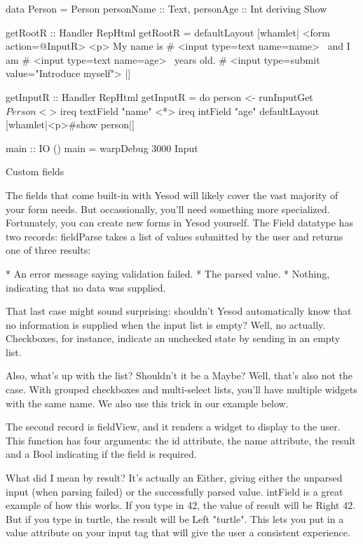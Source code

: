 data Person = Person { personName :: Text, personAge :: Int }
    deriving Show

getRootR :: Handler RepHtml
getRootR = defaultLayout [whamlet|
<form action=@{InputR}>
    <p>
        My name is #
        <input type=text name=name>
        \ and I am #
        <input type=text name=age>
        \ years old. #
        <input type=submit value="Introduce myself">
|]

getInputR :: Handler RepHtml
getInputR = do
    person <- runInputGet $ Person
                <$> ireq textField "name"
                <*> ireq intField "age"
    defaultLayout [whamlet|<p>#{show person}|]

main :: IO ()
main = warpDebug 3000 Input

Custom fields

The fields that come built-in with Yesod will likely cover the vast majority of your form needs. But occassionally, you'll need something more specialized. Fortunately, you can create new forms in Yesod yourself. The Field datatype has two records: fieldParse takes a list of values submitted by the user and returns one of three results:

* An error message saying validation failed.
* The parsed value.
* Nothing, indicating that no data was supplied.

That last case might sound surprising: shouldn't Yesod automatically know that no information is supplied when the input list is empty? Well, no actually. Checkboxes, for instance, indicate an unchecked state by sending in an empty list.

Also, what's up with the list? Shouldn't it be a Maybe? Well, that's also not the case. With grouped checkboxes and multi-select lists, you'll have multiple widgets with the same name. We also use this trick in our example below.

The second record is fieldView, and it renders a widget to display to the user. This function has four arguments: the id attribute, the name attribute, the result and a Bool indicating if the field is required.

What did I mean by result? It's actually an Either, giving either the unparsed input (when parsing failed) or the successfully parsed value. intField is a great example of how this works. If you type in 42, the value of result will be Right 42. But if you type in turtle, the result will be Left "turtle". This lets you put in a value attribute on your input tag that will give the user a consistent experience.


